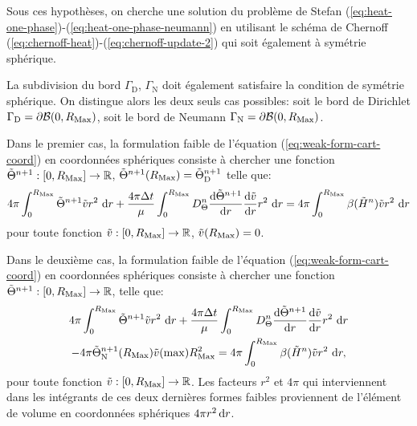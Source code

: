 Sous ces hypothèses, on cherche une solution du problème de Stefan
(\ref{eq:heat-one-phase})-(\ref{eq:heat-one-phase-neumann}) en
utilisant le schéma de Chernoff
(\ref{eq:chernoff-heat})-(\ref{eq:chernoff-update-2}) qui soit également
à symétrie sphérique.

La subdivision du bord $\Gamma_\mathrm{D}$, $\Gamma_\mathrm{N}$ doit
également satisfaire la condition de symétrie sphérique. On distingue
alors les deux seuls cas possibles: soit le bord de Dirichlet
$\Gamma_\mathrm{D} = \partial\mathcal B(0,R_\mathrm{Max})$, soit le bord de
Neumann $\Gamma_\mathrm{N} = \partial\mathcal B(0,R_\mathrm{Max})$.

Dans le premier cas, la formulation faible de l'équation
(\ref{eq:weak-form-cart-coord}) en coordonnées sphériques consiste à
chercher une fonction $\tilde {\Theta}^{n+1}:[0,R_\mathrm{Max}] \to \mathbb
R$, $\tilde{\Theta}^{n+1}(R_\mathrm{Max}) =
\tilde{\Theta}_{\mathrm{D}}^{n+1}$ telle que:
\begin{multline}\label{eq:weak-form-spher-coord-dirichlet}
  4\pi\int_0^{\rmax} \tilde \temperature^{n+1}\tilde v r^2\,\intd{r}
  + \frac{4\pi\timestep}{\mu}\int_0^{\rmax} \electrolytetdiff^n\frac{\mathrm d %
    \tilde \temperature^{n+1}}{\mathrm d r} \frac{\mathrm d \tilde v}{\mathrm d %
    r}r^2\,\intd{r}  %
  = 4\pi\int_0^{\rmax} \beta(\tilde \enthalpydensity^n)\tilde v r^2\,\intd{r}
\end{multline}
pour toute fonction $\tilde v:[0,R_\mathrm{Max}]\to\mathbb R$, $\tilde v(R_\mathrm{Max})
= 0$.

Dans le deuxième cas, la formulation faible de l'équation
(\ref{eq:weak-form-cart-coord}) en coordonnées sphériques consiste à
chercher une fonction $\tilde {\Theta}^{n+1}:[0,R_\mathrm{Max}] \to \mathbb
R$, telle que:
\begin{multline}\label{eq:weak-form-spher-coord-neumann}
  4\pi\int_0^{\rmax} \tilde \temperature^{n+1}\tilde v r^2\,\intd{r}
  + \frac{4\pi\timestep}{\mu}\int_0^{\rmax} \electrolytetdiff^n\frac{\mathrm d %
    \tilde \temperature^{n+1}}{\mathrm d r} \frac{\mathrm d \tilde v}{\mathrm d %
    r}r^2\,\intd{r} \\
  - 4\pi\tilde\temperature^{n+1}_\mathrm{N}(\rmax)\tilde v(\max)\rmax^2%
  = 4\pi\int_0^{\rmax} \beta(\tilde \enthalpydensity^n)\tilde v r^2\,\intd{r},
\end{multline}
pour toute fonction $\tilde v:[0,R_\mathrm{Max}]\to\mathbb R$. Les facteurs
$r^2$ et $4\pi$ qui interviennent dans les intégrants de ces deux dernières
formes faibles proviennent de l'élément de volume en
coordonnées sphériques $4\pi r^2\,\mathrm dr$.

